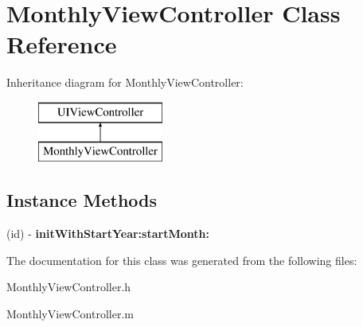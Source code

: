 \hypertarget{interface_monthly_view_controller}{\section{Monthly\+View\+Controller Class Reference}
\label{interface_monthly_view_controller}
}
Inheritance diagram for Monthly\+View\+Controller\+:\begin{figure}[H]
\begin{center}
\leavevmode
\includegraphics[height=2.000000cm]{interface_monthly_view_controller}
\end{center}
\end{figure}
\subsection*{Instance Methods}
\begin{DoxyCompactItemize}
\item 
\hypertarget{interface_monthly_view_controller_a84779aaad5a20f68e7b09cf3001d5140}{(id) -\/ {\bfseries init\+With\+Start\+Year\+:start\+Month\+:}}\label{interface_monthly_view_controller_a84779aaad5a20f68e7b09cf3001d5140}

\end{DoxyCompactItemize}


The documentation for this class was generated from the following files\+:\begin{DoxyCompactItemize}
\item 
Monthly\+View\+Controller.\+h\item 
Monthly\+View\+Controller.\+m\end{DoxyCompactItemize}
